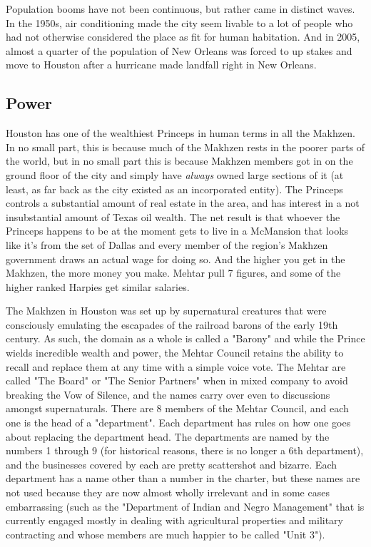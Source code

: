 Population booms have not been continuous, but rather came in distinct waves. In the 1950s, air conditioning made the city seem livable to a lot of people who had not otherwise considered the place as fit for human habitation. And in 2005, almost a quarter of the population of New Orleans was forced to up stakes and move to Houston after a hurricane made landfall right in New Orleans.

\subsection{Power}

\hspace{\parindent} Houston has one of the wealthiest Princeps in human terms in all the Makhzen. In no small part, this is because much of the Makhzen rests in the poorer parts of the world, but in no small part this is because Makhzen members got in on the ground floor of the city and simply have \textit{always} owned large sections of it (at least, as far back as the city existed as an incorporated entity). The Princeps controls a substantial amount of real estate in the area, and has interest in a not insubstantial amount of Texas oil wealth. The net result is that whoever the Princeps happens to be at the moment gets to live in a McMansion that looks like it's from the set of Dallas and every member of the region's Makhzen government draws an actual wage for doing so. And the higher you get in the Makhzen, the more money you make. Mehtar pull 7 figures, and some of the higher ranked Harpies get similar salaries.

The Makhzen in Houston was set up by supernatural creatures that were consciously emulating the escapades of the railroad barons of the early 19th century. As such, the domain as a whole is called a "Barony" and while the Prince wields incredible wealth and power, the Mehtar Council retains the ability to recall and replace them at any time with a simple voice vote. The Mehtar are called "The Board" or "The Senior Partners" when in mixed company to avoid breaking the Vow of Silence, and the names carry over even to discussions amongst supernaturals. There are 8 members of the Mehtar Council, and each one is the head of a "department". Each department has rules on how one goes about replacing the department head. The departments are named by the numbers 1 through 9 (for historical reasons, there is no longer a 6th department), and the businesses covered by each are pretty scattershot and bizarre. Each department has a name other than a number in the charter, but these names are not used because they are now almost wholly irrelevant and in some cases embarrassing (such as the "Department of Indian and Negro Management" that is currently engaged mostly in dealing with agricultural properties and military contracting and whose members are much happier to be called "Unit 3").

